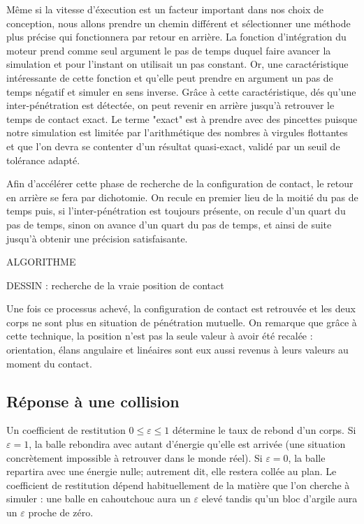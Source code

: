 Même si la vitesse d'éxecution est un facteur important dans nos choix
de conception, nous allons prendre un chemin différent et sélectionner
une méthode plus précise qui fonctionnera par retour en arrière. La
fonction d'intégration du moteur prend comme seul argument le pas de
temps duquel faire avancer la simulation et pour l'instant on
utilisait un pas constant. Or, une caractéristique intéressante de
cette fonction et qu'elle peut prendre en argument un pas de temps
négatif et simuler en sens inverse. Grâce à cette caractéristique, dés
qu'une inter-pénétration est détectée, on peut revenir en arrière
jusqu'à retrouver le temps de contact exact. Le terme "exact" est à
prendre avec des pincettes puisque notre simulation est limitée par
l'arithmétique des nombres à virgules flottantes et que l'on devra se
contenter d'un résultat quasi-exact, validé par un seuil de tolérance
adapté.

Afin d'accélérer cette phase de recherche de la configuration de
contact, le retour en arrière se fera par dichotomie. On recule en
premier lieu de la moitié du pas de temps puis, si l'inter-pénétration
est toujours présente, on recule d'un quart du pas de temps, sinon on
avance d'un quart du pas de temps, et ainsi de suite jusqu'à obtenir
une précision satisfaisante.

ALGORITHME

DESSIN : recherche de la vraie position de contact

Une fois ce processus achevé, la configuration de contact est
retrouvée et les deux corps ne sont plus en situation de pénétration
mutuelle. On remarque que grâce à cette technique, la position n'est
pas la seule valeur à avoir été recalée : orientation, élans angulaire
et linéaires sont eux aussi revenus à leurs valeurs au moment du
contact.

\subsection{Réponse à une collision}

Un coefficient de restitution $0 \leq \varepsilon \leq 1$ détermine le
taux de rebond d'un corps. Si $\varepsilon = 1$, la balle rebondira
avec autant d'énergie qu'elle est arrivée (une situation concrètement
impossible à retrouver dans le monde réel). Si $\varepsilon = 0$, la
balle repartira avec une énergie nulle; autrement dit, elle restera
collée au plan. Le coefficient de restitution dépend habituellement de
la matière que l'on cherche à simuler : une balle en cahoutchouc aura
un $\varepsilon$ elevé tandis qu'un bloc d'argile aura un
$\varepsilon$ proche de zéro.

